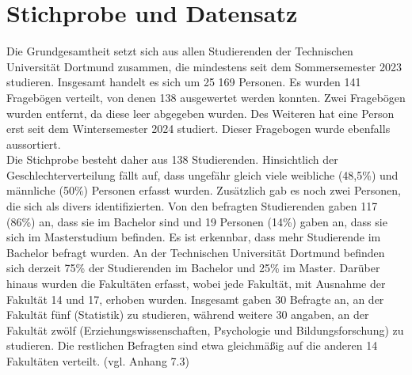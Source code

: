 \documentclass[11pt, a4paper]{article}
\begin{document}
\section{Stichprobe und Datensatz}
\label{Stichprobe und Datensatz}
Die Grundgesamtheit setzt sich aus allen Studierenden der Technischen Universität Dortmund zusammen, die mindestens seit dem Sommersemester 2023 studieren. Insgesamt handelt es sich um 25 169 Personen. Es wurden 141 Fragebögen verteilt, von denen 138 ausgewertet werden konnten. Zwei Fragebögen wurden entfernt, da diese leer abgegeben wurden. Des Weiteren hat eine Person erst seit dem Wintersemester 2024 studiert. Dieser Fragebogen wurde ebenfalls aussortiert. \\
Die Stichprobe besteht daher aus 138 Studierenden. Hinsichtlich der Geschlechterverteilung fällt auf, dass ungefähr gleich viele weibliche (48,5\%) und männliche (50\%) Personen erfasst wurden. Zusätzlich gab es noch zwei Personen, die sich als divers identifizierten. Von den befragten Studierenden gaben 117 (86\%) an, dass sie im Bachelor sind und 19 Personen (14\%) gaben an, dass sie sich im Masterstudium befinden. Es ist erkennbar, dass mehr Studierende im Bachelor befragt wurden. An der Technischen Universität Dortmund befinden sich derzeit 75\% der Studierenden im Bachelor und 25\% im Master. Darüber hinaus wurden die Fakultäten erfasst, wobei jede Fakultät, mit Ausnahme der Fakultät 14 und 17, erhoben wurden. Insgesamt gaben 30 Befragte an, an der Fakultät fünf (Statistik) zu studieren, während weitere 30 angaben, an der Fakultät zwölf (Erziehungswissenschaften, Psychologie und Bildungsforschung) zu studieren. Die restlichen Befragten sind etwa gleichmäßig auf die anderen 14 Fakultäten verteilt. (vgl. Anhang 7.3)\\
\end{document}
